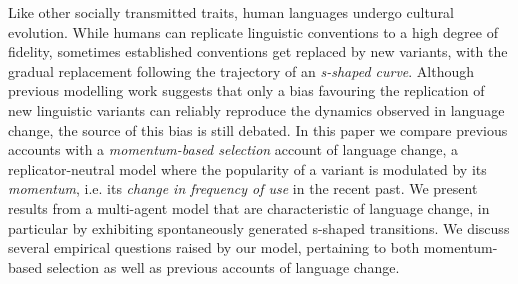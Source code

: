 Like other socially transmitted traits, human languages undergo cultural evolution. While humans can replicate linguistic conventions to a high degree of fidelity, sometimes established conventions get replaced by new variants, with the gradual replacement following the trajectory of an \emph{s-shaped curve}. Although previous modelling work suggests that only a bias favouring the replication of new linguistic variants can reliably reproduce the dynamics observed in language change, the source of this bias is still debated. In this paper we compare previous accounts with a \emph{momentum-based selection} account of language change, a replicator-neutral model where the popularity of a variant is modulated by its \emph{momentum}, i.e. its \emph{change in frequency of use} in the recent past. We present results from a multi-agent model that are characteristic of language change, in particular by exhibiting spontaneously generated s-shaped transitions. We discuss several empirical questions raised by our model, pertaining to both momentum-based selection as well as previous accounts of language change.

